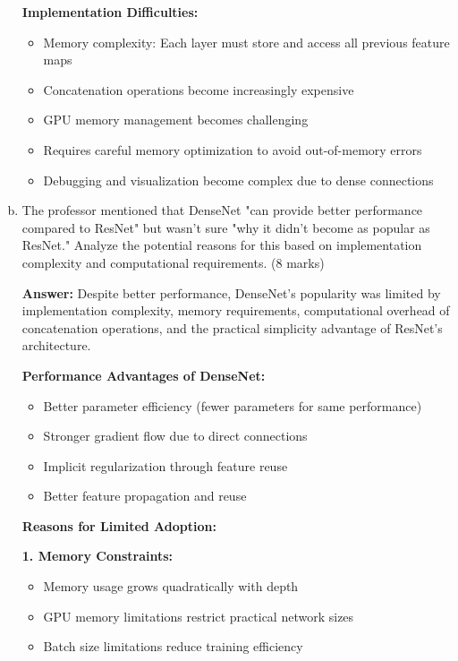 \documentclass[12pt]{article}
\newcommand{\answer}[1]{{\color{answercolor}\textbf{Answer:} #1}}
\newcommand{\explanation}[1]{{\color{explanationcolor}#1}}
\begin{document}
\begin{enumerate}[(a)]
{    \textbf{Implementation Difficulties:}
    \begin{itemize}
        \item Memory complexity: Each layer must store and access all previous feature maps
        \item Concatenation operations become increasingly expensive
        \item GPU memory management becomes challenging
        \item Requires careful memory optimization to avoid out-of-memory errors
        \item Debugging and visualization become complex due to dense connections
    \end{itemize}
    }
    
    \item The professor mentioned that DenseNet "can provide better performance compared to ResNet" but wasn't sure "why it didn't become as popular as ResNet." Analyze the potential reasons for this based on implementation complexity and computational requirements. \hfill (8 marks)
    
    \answer{Despite better performance, DenseNet's popularity was limited by implementation complexity, memory requirements, computational overhead of concatenation operations, and the practical simplicity advantage of ResNet's architecture.}
    
    \explanation{
    \textbf{Performance Advantages of DenseNet:}
    \begin{itemize}
        \item Better parameter efficiency (fewer parameters for same performance)
        \item Stronger gradient flow due to direct connections
        \item Implicit regularization through feature reuse
        \item Better feature propagation and reuse
    \end{itemize}
    
    \textbf{Reasons for Limited Adoption:}
    
    \textbf{1. Memory Constraints:}
    \begin{itemize}
        \item Memory usage grows quadratically with depth
        \item GPU memory limitations restrict practical network sizes
        \item Batch size limitations reduce training efficiency
    \end{itemize}
    
}
\end{enumerate}
\end{document}
